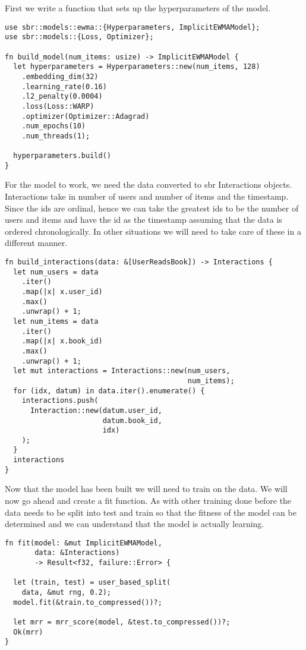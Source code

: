 \documentclass{book}
\begin{document}
First we write a function that sets up the hyperparameters of the model.

\begin{lstlisting}[caption={chapter7/goodbooks-recommender/src/main.rs}, basicstyle=\small]
use sbr::models::ewma::{Hyperparameters, ImplicitEWMAModel};
use sbr::models::{Loss, Optimizer};

fn build_model(num_items: usize) -> ImplicitEWMAModel {
  let hyperparameters = Hyperparameters::new(num_items, 128)
    .embedding_dim(32)
    .learning_rate(0.16)
    .l2_penalty(0.0004)
    .loss(Loss::WARP)
    .optimizer(Optimizer::Adagrad)
    .num_epochs(10)
    .num_threads(1);

  hyperparameters.build()
}
\end{lstlisting}

For the model to work, we need the data converted to sbr Interactions objects. Interactions take in number of users and number of items and the timestamp. Since the ids are ordinal, hence we can take the greatest ids to be the number of users and items and have the id as the timestamp assuming that the data is ordered chronologically. In other situations we will need to take care of these in a different manner.

\begin{lstlisting}[caption={chapter7/goodbooks-recommender/src/main.rs}, basicstyle=\small]
fn build_interactions(data: &[UserReadsBook]) -> Interactions {
  let num_users = data
    .iter()
    .map(|x| x.user_id)
    .max()
    .unwrap() + 1;
  let num_items = data
    .iter()
    .map(|x| x.book_id)
    .max()
    .unwrap() + 1;
  let mut interactions = Interactions::new(num_users,
                                           num_items);
  for (idx, datum) in data.iter().enumerate() {
    interactions.push(
      Interaction::new(datum.user_id,
                       datum.book_id,
                       idx)
    );
  }
  interactions
}
\end{lstlisting}

Now that the model has been built we will need to train on the data. We will now go ahead and create a fit function. As with other training done before the data needs to be split into test and train so that the fitness of the model can be determined and we can understand that the model is actually learning.

\begin{lstlisting}[caption={chapter7/goodbooks-recommender/src/main.rs}, basicstyle=\small]
fn fit(model: &mut ImplicitEWMAModel,
       data: &Interactions)
       -> Result<f32, failure::Error> {

  let (train, test) = user_based_split(
  	data, &mut rng, 0.2);
  model.fit(&train.to_compressed())?;

  let mrr = mrr_score(model, &test.to_compressed())?;
  Ok(mrr)
}
\end{lstlisting}
\end{document}
